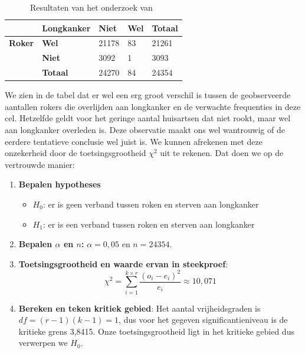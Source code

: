 \begin{table}
  \begin{center}
    \begin{tabular}{@{}lllll@{}}
    	\toprule
    	               & \textbf{Longkanker} & \textbf{Niet} & \textbf{Wel} & \textbf{Totaal} \\
    	\midrule
    	\textbf{Roker} & \textbf{Wel}        & 21178         & 83           & 21261           \\
    	               & \textbf{Niet}       & 3092          & 1            & 3093            \\
    	               & \textbf{Totaal}     & 24270         & 84           & 24354           \\
    	\bottomrule
    \end{tabular}
  \end{center}
  \caption{Resultaten van het onderzoek van~\textcite{Doll1954}}
  \label{tab:dollhill}
\end{table}

We zien in de tabel dat er wel een erg groot verschil is tussen de geobserveerde aantallen rokers die overlijden aan longkanker en de verwachte frequenties in deze cel. Hetzelfde geldt voor het geringe aantal huisartsen dat niet rookt, maar wel aan longkanker overleden is. Deze observatie maakt ons wel wantrouwig of de eerdere tentatieve conclusie wel juist is. We kunnen afrekenen met deze onzekerheid door de toetsingsgrootheid $\chi^{2}$ uit te rekenen. Dat doen we op de vertrouwde manier:

\begin{enumerate}
  \item \textbf{Bepalen hypotheses}
  \begin{itemize}
    \item $H_{0}$: er is geen verband tussen roken en sterven aan longkanker
    \item $H_{1}$: er is een verband tussen roken en sterven aan longkanker
  \end{itemize}
  \item \textbf{Bepalen $\alpha$ en $n$:} $\alpha = 0,05$ en $n = 24354$.
  \item \textbf{Toetsingsgrootheid en waarde ervan in steekproef}:
  \[ \chi^{2} = \sum_{i=1}^{k \times r} \frac{(o_{i} - e_{i})^{2}}{e_{i}} \approx 10,071 \]
  \item \textbf{Bereken en teken kritiek gebied}: Het aantal vrijheidsgraden is $df = (r-1)(k-1) = 1$, dus voor het gegeven significantieniveau is de kritieke grens 3,8415. Onze toetsingsgrootheid ligt in het kritieke gebied dus verwerpen we $H_{0}$.
\end{enumerate}

